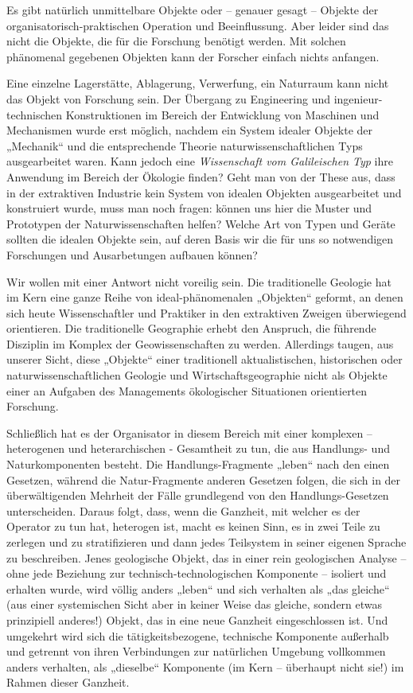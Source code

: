 \documentclass[11pt,a4paper]{article}
\begin{document}
Es gibt natürlich unmittelbare Objekte oder -- genauer gesagt -- Objekte der
organisatorisch-praktischen Operation und Beeinflussung. Aber leider sind das
nicht die Objekte, die für die Forschung benötigt werden. Mit solchen
phänomenal gegebenen Objekten kann der Forscher einfach nichts anfangen.

Eine einzelne Lagerstätte, Ablagerung, Verwerfung, ein Naturraum kann nicht
das Objekt von Forschung sein. Der Übergang zu Engineering und
ingenieur-technischen Konstruktionen im Bereich der Entwicklung von Maschinen
und Mechanismen wurde erst möglich, nachdem ein System idealer Objekte der
„Mechanik“ und die entsprechende Theorie naturwissenschaftlichen Typs
ausgearbeitet waren. Kann jedoch eine \emph{Wissenschaft vom Galileischen Typ}
ihre Anwendung im Bereich der Ökologie finden? Geht man von der These aus,
dass in der extraktiven Industrie kein System von idealen Objekten
ausgearbeitet und konstruiert wurde, muss man noch fragen: können uns hier die
Muster und Prototypen der Naturwissenschaften helfen?  Welche Art von Typen
und Geräte sollten die idealen Objekte sein, auf deren Basis wir die für uns
so notwendigen Forschungen und Ausarbetungen aufbauen können?

Wir wollen mit einer Antwort nicht voreilig sein. Die traditionelle Geologie
hat im Kern eine ganze Reihe von ideal-phänomenalen „Objekten“ geformt, an
denen sich heute Wissenschaftler und Praktiker in den extraktiven Zweigen
überwiegend orientieren.  Die traditionelle Geographie erhebt den Anspruch,
die führende Disziplin im Komplex der Geowissenschaften zu werden. Allerdings
taugen, aus unserer Sicht, diese „Objekte“ einer traditionell
aktualistischen, historischen oder naturwissenschaftlichen Geologie und
Wirtschaftsgeographie nicht als Objekte einer an Aufgaben des Managements
ökologischer Situationen orientierten Forschung.

Schließlich hat es der Organisator in diesem Bereich mit einer komplexen --
heterogenen und heterarchischen - Gesamtheit zu tun, die aus Handlungs- und
Naturkomponenten besteht.  Die Handlungs-Fragmente „leben“ nach den einen
Gesetzen, während die Natur-Fragmente anderen Gesetzen folgen, die sich in der
überwältigenden Mehrheit der Fälle grundlegend von den Handlungs-Gesetzen
unterscheiden.  Daraus folgt, dass, wenn die Ganzheit, mit welcher es der
Operator zu tun hat, heterogen ist, macht es keinen Sinn, es in zwei Teile zu
zerlegen und zu stratifizieren und dann jedes Teilsystem in seiner eigenen
Sprache zu beschreiben. Jenes geologische Objekt, das in einer rein
geologischen Analyse -- ohne jede Beziehung zur technisch-technologischen
Komponente -- isoliert und erhalten wurde, wird völlig anders „leben“ und sich
verhalten als „das gleiche“ (aus einer systemischen Sicht aber in keiner Weise
das gleiche, sondern etwas prinzipiell anderes!) Objekt, das in eine neue
Ganzheit eingeschlossen ist.  Und umgekehrt wird sich die tätigkeitsbezogene,
technische Komponente außerhalb und getrennt von ihren Verbindungen zur
natürlichen Umgebung vollkommen anders verhalten, als „dieselbe“ Komponente
(im Kern -- überhaupt nicht sie!) im Rahmen dieser Ganzheit.
\end{document}

